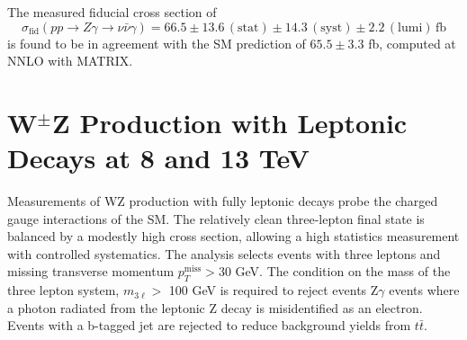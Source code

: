 \documentclass[10pt]{article}
\begin{document}
The measured fiducial cross section of
\begin{equation}
  \sigma_{\mathrm{fid}}(pp \rightarrow Z\gamma \rightarrow \nu\bar{\nu}\gamma) = 66.5 \pm 13.6 \, \mathrm{(stat)} \pm 14.3 \, 
        \mathrm{(syst)} \pm 2.2 \, \mathrm{(lumi)} \,\mathrm{fb}
\end{equation}
is found to be in agreement with the SM prediction of $65.5 \pm 3.3$ fb, computed at
NNLO with MATRIX. \cite{bleh}

\section{W$^{\pm}$Z Production with Leptonic Decays at 8 and 13 TeV}

Measurements of WZ production with fully leptonic decays probe the charged
gauge interactions of the SM. The relatively clean three-lepton final state
is balanced by a modestly high cross section, allowing a high statistics measurement 
with controlled systematics. The analysis selects events with three leptons and 
missing transverse momentum $p_{T}^{\mathrm{miss}} > 30$ GeV. The condition on the
mass of the three lepton system,
$m_{3\ell} > $ 100 GeV is required to reject events Z$\gamma$ events where a photon
radiated from the leptonic Z decay is misidentified as an electron. Events with
a b-tagged jet are rejected to reduce background yields from $t\bar{t}$.
\end{document}
